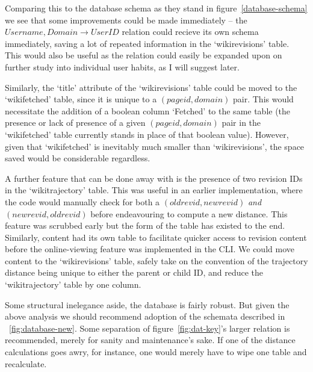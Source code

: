 Comparing this to the database schema as they stand in
figure~\ref{database-schema} we see that some improvements could be
made immediately -- the $Username, Domain \rightarrow UserID$ relation
could recieve its own schema immediately, saving a lot of repeated
information in the `wikirevisions' table. This would also be useful as
the relation could easily be expanded upon on further study into
individual user habits, as I will suggest later.

Similarly, the `title' attribute of the `wikirevisions' table could be
moved to the `wikifetched' table, since it is unique to a
$(pageid,domain)$ pair. This would necessitate the addition of a
boolean column `Fetched' to the same table (the presence or lack of
presence of a given $(pageid,domain)$ pair in the `wikifetched' table
currently stands in place of that boolean value). However, given that
`wikifetched' is inevitably much smaller than `wikirevisions', the
space saved would be considerable regardless.

A further feature that can be done away with is the presence of two
revision IDs in the `wikitrajectory' table. This was useful in an
earlier implementation, where the code would manually check for both a
$(oldrevid,newrevid)$ \textit{and} $(newrevid,oldrevid)$ before
endeavouring to compute a new distance. This feature was scrubbed
early but the form of the table has existed to the end. Similarly,
content had its own table to facilitate quicker access to revision
content before the online-viewing feature was implemented in the
CLI. We could move content to the `wikirevisions' table, safely take
on the convention of the trajectory distance being unique to either
the parent or child ID, and reduce the `wikitrajectory' table by one
column.

Some structural inelegance aside, the database is fairly robust. But
given the above analysis we should recommend adoption of the schemata
described in ~\ref{fig:database-new}. Some separation of
figure~\ref{fig:dat-key}'s larger relation is recommended, merely for
sanity and maintenance's sake. If one of the distance calculations
goes awry, for instance, one would merely have to wipe one table and
recalculate.

